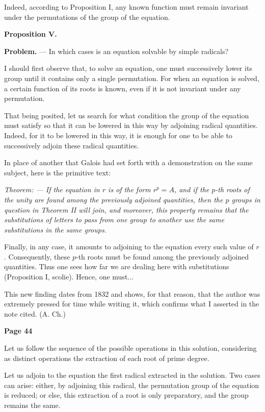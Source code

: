 \documentclass{article}
\begin{document}
Indeed, according to Proposition I, any known function must remain invariant under the permutations of the group of the equation.

\textbf{Proposition V.}

\textbf{Problem.} --- In which cases is an equation solvable by simple radicals?

I should first observe that, to solve an equation, one must successively lower its group until it contains only a single permutation. For when an equation is solved, a certain function of its roots is known, even if it is not invariant under any permutation.

That being posited, let us search for what condition the group of the equation must satisfy so that it can be lowered in this way by adjoining radical quantities. Indeed, for it to be lowered in this way, it is enough for one to be able to successively adjoin these radical quantities.

In place of another that Galois had set forth with a demonstration on the same subject, here is the primitive text:

\emph{Theorem: --- If the equation in $r$ is of the form $r^p = A$, and if the $p$-th roots of the unity are found among the previously adjoined quantities, then the $p$ groups in question in Theorem II will join, and moreover, this property remains that the substitutions of letters to pass from one group to another use the same substitutions in the same groups.}

Finally, in any case, it amounts to adjoining to the equation every such value of $r$. Consequently, these $p$-th roots must be found among the previously adjoined quantities. Thus one sees how far we are dealing here with substitutions (Proposition I, scolie). Hence, one must...

This new finding dates from 1832 and shows, for that reason, that the author was extremely pressed for time while writing it, which confirms what I asserted in the note cited. (A. Ch.)


\newpage

\centerline{\textbf{Page 44}}

\medskip

Let us follow the sequence of the possible operations in this solution, considering as distinct operations the extraction of each root of prime degree.

Let us adjoin to the equation the first radical extracted in the solution. Two cases can arise: either, by adjoining this radical, the permutation group of the equation is reduced; or else, this extraction of a root is only preparatory, and the group remains the same.
\end{document}
